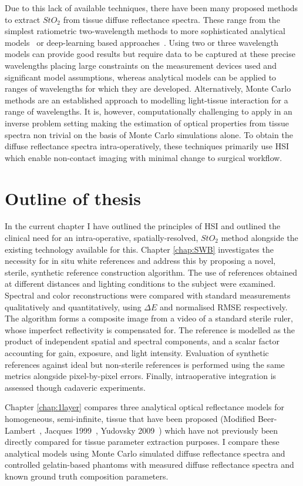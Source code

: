 Due to this lack of available techniques, there have been many proposed methods to extract $StO_2$ from tissue diffuse reflectance spectra. These range from the simplest ratiometric two-wavelength methods to more sophisticated analytical models~\cite{MacKenzie2018} or deep-learning based approaches~\cite{Ayala2023}. Using two or three wavelength models can provide good results but require data to be captured at these precise wavelengths placing large constraints on the measurement devices used and significant model assumptions, whereas analytical models can be applied to ranges of wavelengths for which they are developed. Alternatively, Monte Carlo methods are an established approach to modelling light-tissue interaction for a range of wavelengths. It is, however, computationally challenging to apply in an inverse problem setting making the estimation of optical properties from tissue spectra non trivial on the basis of Monte Carlo simulations alone. To obtain the diffuse reflectance spectra intra-operatively, these techniques primarily use HSI which enable non-contact imaging with minimal change to surgical workflow. 

\section{Outline of thesis}
In the current chapter I have outlined the principles of HSI and outlined the clinical need for an intra-operative, spatially-resolved, $StO_2$ method alongside the existing technology available for this. 
Chapter \ref{chap:SWB} investigates the necessity for in situ white references and address this by proposing a novel, sterile, synthetic reference construction algorithm. The use of references obtained at different distances and lighting conditions to the subject were examined. Spectral and color reconstructions were compared with standard measurements qualitatively and quantitatively, using $\Delta E$ and normalised RMSE respectively. The algorithm forms a composite image from a video of a standard sterile ruler, whose imperfect reflectivity is compensated for. The reference is modelled as the product of independent spatial and spectral components, and a scalar factor accounting for gain, exposure, and light intensity. Evaluation of synthetic references against ideal but non-sterile references is performed using the same metrics alongside pixel-by-pixel errors. Finally, intraoperative integration is assessed though cadaveric experiments.

Chapter \ref{chap:1layer} compares three analytical optical reflectance models for homogeneous, semi-infinite, tissue that have been proposed (Modified Beer-Lambert~\cite{Clancy2015}, Jacques 1999~\cite{Jacques1999}, Yudovsky 2009~\cite{Yudovsky2009}) which have not previously been directly compared for tissue parameter extraction purposes. I compare these analytical models using Monte Carlo simulated diffuse reflectance spectra and controlled gelatin-based phantoms with measured diffuse reflectance spectra and known ground truth composition parameters. 

